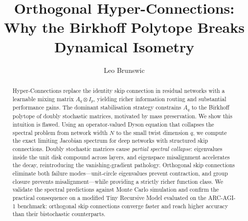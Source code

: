 

\title{Orthogonal Hyper-Connections:\\Why the Birkhoff Polytope Breaks Dynamical Isometry}
\author{Leo Brunswic}
\date{}


\maketitle
\begin{abstract}
Hyper-Connections replace the identity skip connection in residual networks with a learnable mixing matrix $A_q \otimes I_p$, yielding richer information routing and substantial performance gains. The dominant stabilisation strategy constrains $A_q$ to the Birkhoff polytope of doubly stochastic matrices, motivated by mass preservation. We show this intuition is flawed. Using an operator-valued Dyson equation that collapses the spectral problem from network width $N$ to the small twist dimension $q$, we compute the exact limiting Jacobian spectrum for deep networks with structured skip connections. Doubly stochastic matrices cause \emph{partial spectral collapse}: eigenvalues inside the unit disk compound across layers, and eigenspace misalignment accelerates the decay, reintroducing the vanishing-gradient pathology. Orthogonal skip connections eliminate both failure modes---unit-circle eigenvalues prevent contraction, and group closure prevents misalignment---while providing a strictly richer function class. We validate the spectral predictions against Monte Carlo simulation and confirm the practical consequence on a modified Tiny Recursive Model evaluated on the ARC-AGI-1 benchmark: orthogonal skip connections converge faster and reach higher accuracy than their bistochastic counterparts.
\end{abstract}







\appendix








